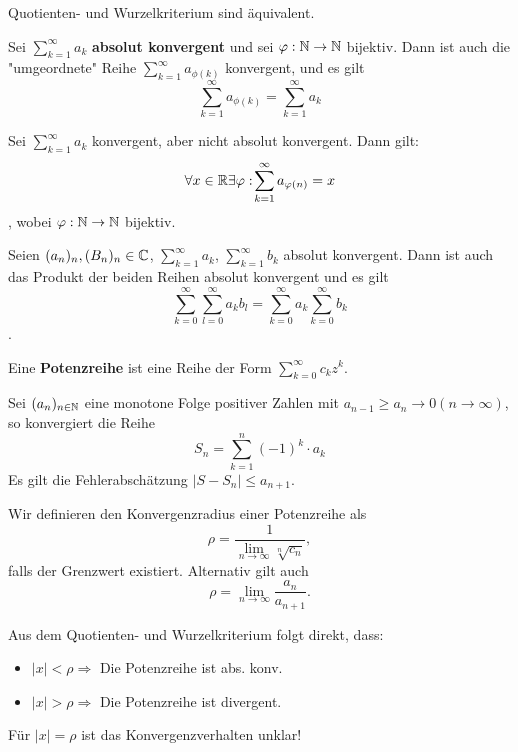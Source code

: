 \begin{remark}
Quotienten- und Wurzelkriterium sind äquivalent.
\end{remark}


\begin{theorem}
Sei $ \sum_{k=1}^{\infty}a_k$  \textbf{absolut konvergent} und sei $\varphi: \mathbb{N} \rightarrow \mathbb{N} $ bijektiv. Dann ist auch die "umgeordnete" Reihe $ \sum_{k=1}^{\infty}a_{\phi(k)}$ konvergent, und es gilt
\[
\sum_{k=1}^{\infty}a_{\phi(k)} = \sum_{k=1}^{\infty}a_k
\]
\end{theorem}

\begin{theorem}[Riemann]
Sei $\sum_{k=1}^{\infty}a_k$ konvergent, aber nicht absolut konvergent. Dann gilt:
$$\forall x\in \mathbb{R}\exists\varphi:\! \sum_{k=1}^{\infty}a_{\varphi(n)} = x$$,
wobei $\varphi: \mathbb{N} \to \mathbb{N}$ bijektiv.
\end{theorem}

\begin{theorem}
Seien $(a_n)_n, (B_n)_n \in \mathbb{C}$, $\sum_{k=1}^{\infty}a_k$, $ \sum_{k=1}^{\infty}b_k$  absolut konvergent. Dann ist auch das Produkt der beiden Reihen absolut konvergent und es gilt
$$\sum_{k=0}^{\infty} \sum_{l=0}^{\infty}{a_k b_l} = \sum_{k=0}^\infty a_k \sum_{k=0}^\infty b_k$$.
\end{theorem}

\begin{definition}
Eine \textbf{Potenzreihe} ist eine Reihe der Form $\sum_{k=0}^\infty c_k z^k$.
\end{definition}

\begin{theorem}
Sei $(a_n)_{n\in\mathbb{N}}$ eine monotone Folge positiver Zahlen mit $a_{n-1} \geq a_n \to 0 (n \to \infty)$, so konvergiert die Reihe 
$$S_n = \sum_{k=1}^n (-1)^k \cdot a_k$$
Es gilt die Fehlerabschätzung $|S-S_n| \leq a_{n+1}$.
\end{theorem}

\begin{definition}[Konvergenzradius]
Wir definieren den Konvergenzradius einer Potenzreihe als
$$\rho = \frac{1}{\lim_{n\rightarrow\infty} {\sqrt[n]{c_n}}},$$
falls der Grenzwert existiert.
Alternativ gilt auch $$\rho = \lim_{n\rightarrow\infty} \frac{a_n}{a_{n+1}}.$$
\end{definition}

\begin{theorem}
Aus dem Quotienten- und Wurzelkriterium folgt direkt, dass:
\begin{itemize}
\item $|x|<\rho\Rightarrow$ Die Potenzreihe ist abs. konv.
\item $|x|>\rho \Rightarrow$ Die Potenzreihe ist divergent.
\end{itemize}
Für $|x| = \rho$ ist das Konvergenzverhalten unklar!
\end{theorem}

